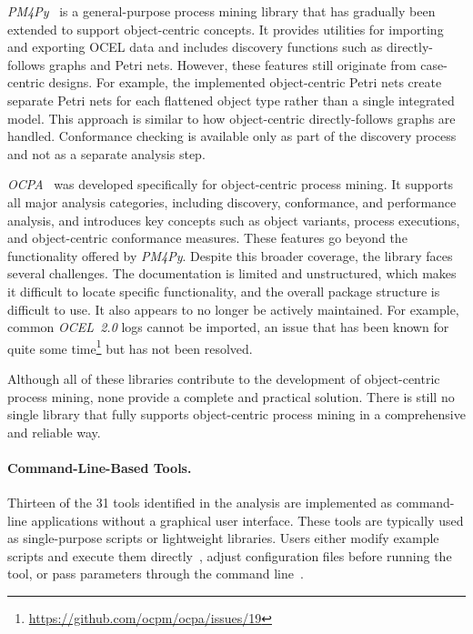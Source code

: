 \textit{PM4Py}~\cite{pm4py} is a general-purpose process mining library that has gradually been extended to support object-centric concepts.
It provides utilities for importing and exporting OCEL data and includes discovery functions such as directly-follows graphs and Petri nets.
However, these features still originate from case-centric designs.
For example, the implemented object-centric Petri nets create separate Petri nets for each flattened object type rather than a single integrated model.
This approach is similar to how object-centric directly-follows graphs are handled.
Conformance checking is available only as part of the discovery process and not as a separate analysis step.

\textit{OCPA}~\cite{ocpa} was developed specifically for object-centric process mining.
It supports all major analysis categories, including discovery, conformance, and performance analysis, and introduces key concepts such as object variants, process executions, and object-centric conformance measures.
These features go beyond the functionality offered by \textit{PM4Py}.
Despite this broader coverage, the library faces several challenges.
The documentation is limited and unstructured, which makes it difficult to locate specific functionality, and the overall package structure is difficult to use.
It also appears to no longer be actively maintained.
For example, common \textit{OCEL~2.0} logs cannot be imported, an issue that has been known for quite some time\footnote{\url{https://github.com/ocpm/ocpa/issues/19}} but has not been resolved.

Although all of these libraries contribute to the development of object-centric process mining, none provide a complete and practical solution.
There is still no single library that fully supports object-centric process mining in a comprehensive and reliable way.

\paragraph{Command-Line-Based Tools.}

Thirteen of the 31 tools identified in the analysis are implemented as command-line applications without a graphical user interface. These tools are typically used as single-purpose scripts or lightweight libraries. Users either modify example scripts and execute them directly~\cite{totem}, adjust configuration files before running the tool, or pass parameters through the command line~\cite{ococomot}.


